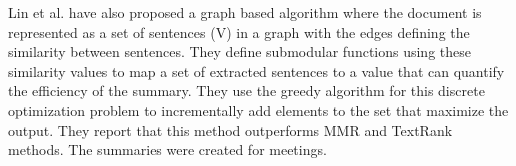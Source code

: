 Lin et al. \cite{conf/asru/LinBX09} have also proposed a graph based algorithm where the document is represented as a set of sentences (V) in a graph with the edges defining the similarity between sentences.
They define submodular functions using these similarity values to map a set of extracted sentences to a value that can quantify the efficiency of the summary.
They use the greedy algorithm for this discrete optimization problem to incrementally add elements to the set that maximize the output.
They report that this method outperforms MMR and TextRank methods.
The summaries were created for meetings.
